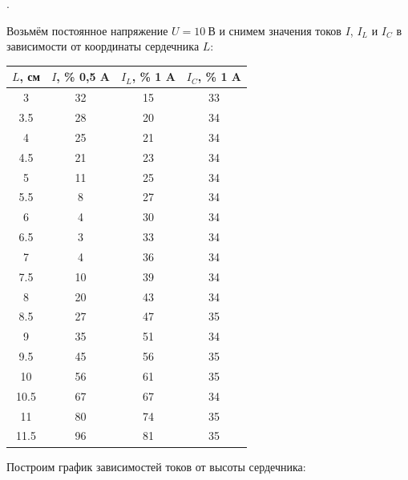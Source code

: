 \documentclass[a4paper, 12pt]{article}
\newcounter{Points}
\newcommand{\point}{\arabic{Points}. \addtocounter{Points}{1}}
\begin{document}
\point Возьмём постоянное напряжение $U = 10~В$ и снимем значения токов $I$, $I_L$ и $I_C$ в зависимости от координаты сердечника $L$:

\begin{table}[!h]
    \begin{tabular}{|c|c|c|c|} \hline
        $L$, см & $I$, \% 0,5 A & $I_L$, \% 1 A & $I_C$, \% 1 A \\ \hline
        3 & 32 & 15 & 33\\ \hline
        3.5 & 28 & 20 & 34\\ \hline
        4 & 25 & 21 & 34\\ \hline
        4.5 & 21 & 23 & 34\\ \hline
        5 & 11 & 25 & 34\\ \hline
        5.5 & 8 & 27 & 34\\ \hline
        6 & 4 & 30 & 34\\ \hline
        6.5 & 3 & 33 & 34\\ \hline
        7 & 4 & 36 & 34\\ \hline
        7.5 & 10 & 39 & 34\\ \hline
        8 & 20 & 43 & 34\\ \hline
        8.5 & 27 & 47 & 35\\ \hline
        9 & 35 & 51 & 34\\ \hline
        9.5 & 45 & 56 & 35\\ \hline
        10 & 56 & 61 & 35\\ \hline
        10.5 & 67 & 67 & 34\\ \hline
        11 & 80 & 74 & 35\\ \hline
        11.5 & 96 & 81 & 35\\ \hline
    \end{tabular}
\end{table}

Построим график зависимостей токов от высоты сердечника:
\end{document}
